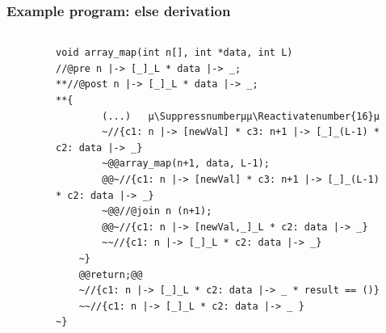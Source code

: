 \documentclass{beamer}
\makeatletter
\let\origthelstnumber\thelstnumber
\newcommand*\Suppressnumber{%
  \lst@AddToHook{OnNewLine}{%
    \let\thelstnumber\relax%
     \advance\c@lstnumber-\@ne\relax%
    }%
}
\newcommand*\Reactivatenumber[1]{%
  \setcounter{lstnumber}{\numexpr#1-1\relax}
  \lst@AddToHook{OnNewLine}{%
   \let\thelstnumber\origthelstnumber%
   \refstepcounter{lstnumber}
  }%
}
\makeatother
\begin{document}
\begin{frame}[fragile]
\frametitle{Example program: else derivation}
\vspace{-2em}
\begin{columns}
\begin{column}{0.03\textwidth}
\end{column}
\begin{column}{0.97\textwidth}
\begin{figure}[h]
  \centering
\begin{lstlisting}[style=CStyleOverlay, captionpos = t]
void array_map(int n[], int *data, int L)
//@pre n |-> [_]_L * data |-> _;
**//@post n |-> [_]_L * data |-> _;
**{
		(...)	µ\Suppressnumberµµ\Reactivatenumber{16}µ
		~//{c1: n |-> [newVal] * c3: n+1 |-> [_]_(L-1) * c2: data |-> _}
		~@@array_map(n+1, data, L-1);
		@@~//{c1: n |-> [newVal] * c3: n+1 |-> [_]_(L-1) * c2: data |-> _}
		~@@//@join n (n+1);
		@@~//{c1: n |-> [newVal,_]_L * c2: data |-> _}
		~~//{c1: n |-> [_]_L * c2: data |-> _}
	~}
	@@return;@@
	~//{c1: n |-> [_]_L * c2: data |-> _ * result == ()}
	~~//{c1: n |-> [_]_L * c2: data |-> _ }
~}
\end{lstlisting}
\end{figure}
\end{column}
\end{columns}
\end{frame}
\end{document}
